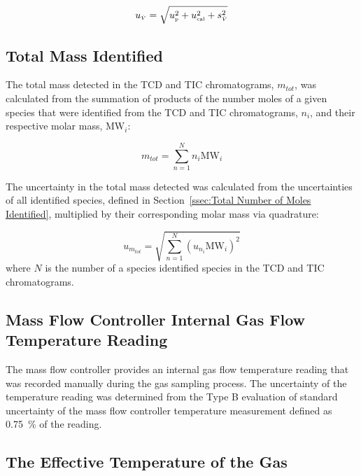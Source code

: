 \documentclass[12pt]{article}
\begin{document}
\begin{equation}
\label{eq:volumetric_flow_uncertainty}
u_{\scriptscriptstyle \dot{V}} = \sqrt{u_{\rm \scriptscriptstyle p}^2 + u_{\rm \scriptscriptstyle cal}^2 + s_{\scriptscriptstyle \dot{V}}^2}
\end{equation}

\subsection{Total Mass Identified}
\label{ssec:Total_Mass_Identified_into_GC/MSD}
The total mass detected in the TCD and TIC chromatograms, $m_{tot}$, was calculated from the summation of products of the number moles of a given species that were identified from the TCD and TIC chromatograms, $n_{i}$, and their respective molar mass, ${\textrm{MW}_{i}}$: 

\begin{equation}
\label{eq:total_mass_detected_uncertainty}
m_{tot}=\sum_{n=1}^{N} n_{i}{\textrm{MW}_{i}}
\end{equation}

The uncertainty in the total mass detected was calculated from the uncertainties of all identified species, defined in Section~\ref{ssec:Total Number of Moles Identified}, multiplied by their corresponding molar mass via quadrature:

\begin{equation}
\label{eq:total_mass_detected_uncertainty}
u_{\scriptscriptstyle m_{tot}}=\sqrt{{\sum_{n=1}^{N} (u_{\scriptscriptstyle n_{i}}{\textrm{MW}_{i}})^2}}
\end{equation}
where $N$ is the number of a species identified species in the TCD and TIC chromatograms. 

\subsection{Mass Flow Controller Internal Gas Flow Temperature Reading}
\label{ssec:MFC_Temp}

The mass flow controller provides an internal gas flow temperature reading that was recorded manually during the gas sampling process. The uncertainty of the temperature reading was determined from the Type B evaluation of standard uncertainty of the mass flow controller temperature measurement defined as 0.75~\% of the reading.

\subsection{The Effective Temperature of the Gas}
\label{ssec:Probe_Temp}
\end{document}
